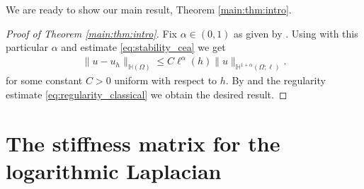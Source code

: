 \documentclass[10 pt]{article}
\numberwithin{equation}{section}
\begin{document}
We are ready to show our main result, Theorem \ref{main:thm:intro}.

\begin{proof}[Proof of Theorem \ref{main:thm:intro}]
Fix $\alpha\in(0,1)$ as given by . Using  with this particular $\alpha$ and estimate \eqref{eq:stability_cea} we get
%
\begin{align*}
    \|u-u_h\|_{\mathbb H(\Omega)}\leq C\ell^{\alpha}(h)\|u\|_{\mathbb{H}^{1+\alpha}(\Omega;\ell)}.
\end{align*}
%
for some constant $C>0$ uniform with respect to $h$. By  and the regularity estimate \eqref{eq:regularity_classical} we obtain the desired result.
\end{proof}


\section{The stiffness matrix for the logarithmic Laplacian}\label{sec:stiffness}
\end{document}
